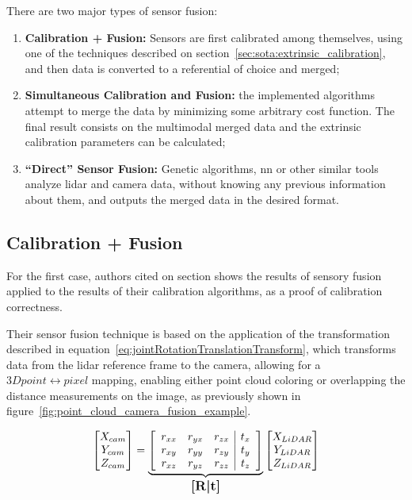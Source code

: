 There are two major types of sensor fusion: 

\begin{enumerate}
	\item \textbf{Calibration + Fusion:} Sensors are first calibrated among themselves, using one of the techniques described on section~\ref{sec:sota:extrinsic_calibration}, and then data is converted to a referential of choice and merged;
	\item \textbf{Simultaneous Calibration and Fusion:} the implemented algorithms attempt to merge the data by minimizing some arbitrary cost function. The final result consists on the multimodal merged data and the extrinsic calibration parameters can be calculated;
	\item \textbf{``Direct'' Sensor Fusion:} Genetic algorithms, \ac{nn} or other similar tools analyze \ac{lidar} and camera data, without knowing any previous information about them, and outputs the merged data in the desired format.
\end{enumerate} 


\subsection{Calibration + Fusion}
For the first case, authors cited on section  shows the results of sensory fusion applied to the results of their calibration algorithms, as a proof of calibration correctness. 

Their sensor fusion technique is based on the application of the transformation described in equation~\ref{eq:jointRotationTranslationTransform}, which transforms data from the \ac{lidar} reference frame to the camera, allowing for a $3D point \leftrightarrow pixel$ mapping, enabling either point cloud coloring or overlapping the distance measurements on the image, as previously shown in figure~\ref{fig:point_cloud_camera_fusion_example}.
	
\begin{equation}
	\label{eq:jointRotationTranslationTransform}
	\begin{bmatrix}
		X_{cam} \\
		Y_{cam} \\
		Z_{cam} 
	\end{bmatrix}
	= 
		\underbrace{
	\left[
			\begin{array}{ccc|c}
				r_{xx} & r_{yx} & r_{zx} & t_x \\
					r_{xy} & r_{yy} & r_{zy} & t_y \\
					r_{xz} & r_{yz} & r_{zz} & t_z 
				\end{array}
		\right]
		}_\text{\large\textbf{[R|t]}}
	\begin{bmatrix}
		X_{LiDAR} \\
		Y_{LiDAR} \\
		Z_{LiDAR} 
	\end{bmatrix}
\end{equation}


